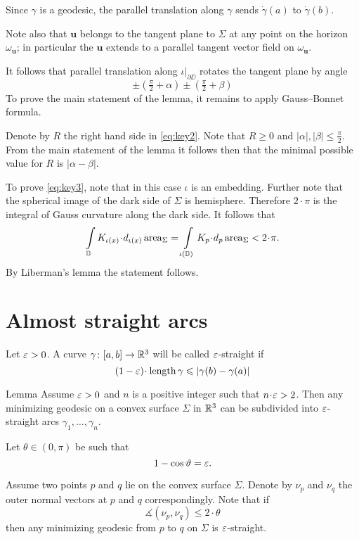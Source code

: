 \documentclass[a4paper,10pt]{amsart}
\begin{document}
Since $\gamma$ is a geodesic, 
the parallel translation along $\gamma$ 
sends $\dot\gamma(a)$ to $\dot\gamma(b)$.

Note also that $\bm{u}$ belongs to the tangent plane to $\Sigma$ at any point on the horizon $\omega_{\bm{u}}$;
in particular the $\bm{u}$ extends to a parallel tangent vector field on $\omega_{\bm{u}}$.

It follows that parallel translation along $\iota|_{\partial\DD}$ 
rotates the tangent plane by angle 
\[\pm(\tfrac\pi2+\alpha)\pm(\tfrac\pi2+\beta)\]
To prove the main statement of the lemma,
it remains to apply Gauss--Bonnet formula.

Denote by $R$ the right hand side in \ref{eq:key2}.
Note that $R\ge 0$ 
and $|\alpha|,|\beta|\le \tfrac\pi2$.
From the main statement of the lemma it follows then that the minimal possible value for $R$ is $\bigl|\alpha-\beta\bigr|$.

To prove \ref{eq:key3}, note that 
in this case $\iota$ is an embedding.
Further note that the spherical image of the dark side of $\Sigma$ is hemisphere.
Therefore $2\cdot\pi$ is the integral of Gauss curvature along the dark side.
It follows that
\[\int\limits_{\DD} K_{\iota(x)}\cdot d_{\iota(x)}\area_\Sigma
=
\int\limits_{\iota(\DD)} K_p\cdot d_p\area_\Sigma
<2\cdot\pi.\]
By Liberman's lemma the statement follows.
\qeds

\section{Almost straight arcs}

Let $\varepsilon>0$.
A curve $\gamma\colon[a,b]\to\mathbb{R}^3$ will be called $\varepsilon$-straight
if 
\[(1-\eps)\cdot\length \gamma\le |\gamma(b)-\gamma(a)|\]

\begin{thm}{Lemma}\label{lem:eps-straight}
Assume $\varepsilon>0$ 
and $n$ is a positive integer such that
$n\cdot\eps>2$.
Then any minimizing geodesic
on a convex surface $\Sigma$ in $\mathbb{R}^3$
can be subdivided 
into $\varepsilon$-straight arcs $\gamma_1,\dots,\gamma_n$.
\end{thm}

Let $\theta\in(0,\pi)$
be such that 
\[1-\cos\vartheta=\varepsilon.\]

Assume two points $p$ and $q$ lie on the convex surface $\Sigma$.
Denote by $\nu_p$ and $\nu_q$ the outer normal vectors at $p$ and $q$ correspondingly.
Note that if 
\[\measuredangle(\nu_p,\nu_q)\le 2\cdot\theta\]
then any minimizing geodesic from $p$ to $q$ on $\Sigma$
is $\varepsilon$-straight.
\end{document}
